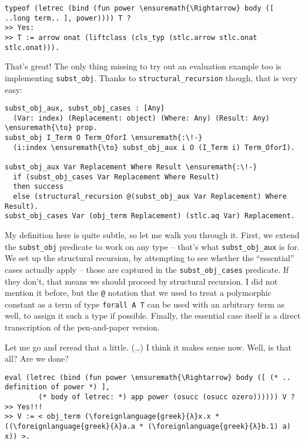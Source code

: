 \begin{verbatim}
typeof (letrec (bind (fun power \ensuremath{\Rightarrow} body ([ ..long term.. ], power)))) T ?
>> Yes:
>> T := arrow onat (liftclass (cls_typ (stlc.arrow stlc.onat stlc.onat))).
\end{verbatim}

\heroADVISOR{} That's great! The only thing missing to try out an evaluation
example too is implementing \texttt{subst\_obj}. Thanks to
\texttt{structural\_recursion} though, that is very easy:

\begin{verbatim}
subst_obj_aux, subst_obj_cases : [Any]
  (Var: index) (Replacement: object) (Where: Any) (Result: Any) \ensuremath{\to} prop.
subst_obj I_Term O Term_OforI \ensuremath{:\!-}
  (i:index \ensuremath{\to} subst_obj_aux i O (I_Term i) Term_OforI).

subst_obj_aux Var Replacement Where Result \ensuremath{:\!-}
  if (subst_obj_cases Var Replacement Where Result)
  then success
  else (structural_recursion @(subst_obj_aux Var Replacement) Where Result).
subst_obj_cases Var (obj_term Replacement) (stlc.aq Var) Replacement.
\end{verbatim}

\noindent
My definition here is quite subtle, so let me walk you through it.
First, we extend the \texttt{subst\_obj} predicate to work on any type
-- that's what \texttt{subst\_obj\_aux} is for. We set up the structural
recursion, by attempting to see whether the ``essential'' cases actually
apply -- those are captured in the \texttt{subst\_obj\_cases} predicate.
If they don't, that means we should proceed by structural recursion. I
did not mention it before, but the \texttt{@} notation that we used to
treat a polymorphic constant as a term of type \texttt{forall\ A\ T} can
be used with an arbitrary term as well, to assign it such a type if
possible. Finally, the essential case itself is a direct transcription
of the pen-and-paper version.

\heroSTUDENT{} Let me go and reread that a little. (\ldots{}) I think it makes
sense now. Well, is that all? Are we done?

\begin{verbatim}
eval (letrec (bind (fun power \ensuremath{\Rightarrow} body ([ (* .. definition of power *) ],
        (* body of letrec: *) app power (osucc (osucc ozero)))))) V ?
>> Yes!!!
>> V := < obj_term (\foreignlanguage{greek}{λ}x.x * ((\foreignlanguage{greek}{λ}a.a * (\foreignlanguage{greek}{λ}b.1) a) x)) >.
\end{verbatim}

